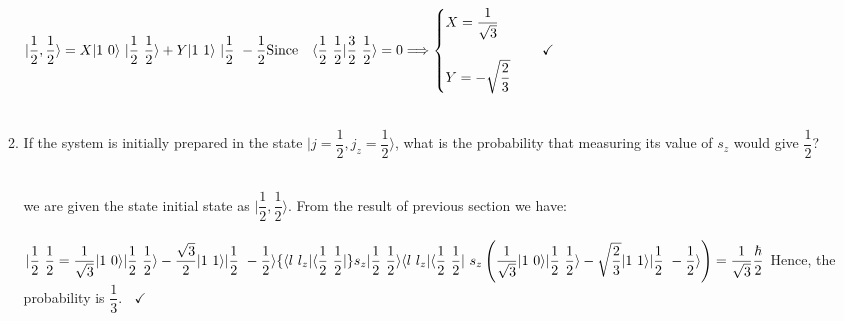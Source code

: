 \documentclass[fleqn]{article}
\begin{document}
\begin{enumerate}
\begin{enumerate}
{          \\
          \\
          $
            |\dfrac{1}{2}, \dfrac{1}{2} \rangle=X|1 ~ 0 \rangle ~ |\dfrac{1}{2} ~ \dfrac{1}{2} \rangle+Y|1 ~ 1 \rangle ~ |\dfrac{1}{2} ~ -\dfrac{1}{2}
            \\
            \\
            \\
            \text{Since} ~~~ \langle \dfrac{1}{2} ~ \dfrac{1}{2} | \dfrac{3}{2} ~ \dfrac{1}{2} \rangle=0 \Longrightarrow \begin{cases}
              X=\dfrac{1}{\sqrt{3}}
              \\
              \\
              Y=-\sqrt{\dfrac{2}{3}}
            \end{cases} ~~~ \checkmark
          $
          \\
          \\
        }

      \item If the system is initially prepared in the state $\vert j=\dfrac{1}{2}, j_z=\dfrac{1}{2} \rangle$, what is the probability that
      measuring its value of $s_z$ would give $\dfrac{1}{2}$?

        \textcolor{hwColor}{
          \\
          we are given the state initial state as $\vert \dfrac{1}{2}, \dfrac{1}{2} \rangle$. From the result of previous section we have:
          \\
          \\
          $
            | \dfrac{1}{2} ~ \dfrac{1}{2}=\dfrac{1}{\sqrt{3}} |1 ~ 0 \rangle | \dfrac{1}{2} ~ \dfrac{1}{2} \rangle-\dfrac{\sqrt{3}}{2} | 1 ~ 1 \rangle | \dfrac{1}{2} ~ -\dfrac{1}{2} \rangle
            \\
            \\
            \{ \langle l ~ l_z | \langle \dfrac{1}{2} ~ \dfrac{1}{2} | \} s_z |\dfrac{1}{2} ~ \dfrac{1}{2} \rangle
            \\
            \\
            \\
            \langle l ~ l_z | \langle \dfrac{1}{2} ~ \dfrac{1}{2} | ~ s_z \left(
              \dfrac{1}{\sqrt{3}} |1 ~ 0 \rangle |\dfrac{1}{2} ~ \dfrac{1}{2} \rangle-\sqrt{\dfrac{2}{3}} |1 ~ 1 \rangle | \dfrac{1}{2} ~ -\dfrac{1}{2} \rangle
            \right)=\dfrac{1}{\sqrt{3}} \dfrac{\hbar}{2}
            \\
            \\
            \\
          $
          Hence, the probability is $\dfrac{1}{3}. ~~~~ \checkmark$
          \\
          \\ 
        }


\end{enumerate}
\end{enumerate}
\end{document}
